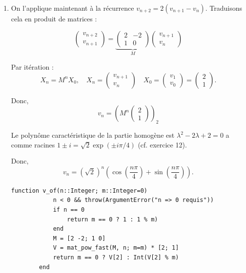 \begin{solution}
\begin{enumerate}
\begin{lstlisting}[basicstyle=\ttfamily\small, mathescape=true]
        function mat_pow_fast(A, n::Integer; m::Integer=0)
            n < 0 && throw(ArgumentError("n => 0 requis"))
            R = [1 0; 0 1]
            B, e = copy(A), n
            while e > 0
                if isodd(e)
                    R = mul2(R, B; m=m)
                end
                B = mul2(B, B; m=m)
                e >>= 1
            end
            return R
        end
        \end{lstlisting}

        \item On l'applique maintenant à la récurrence $v_{n+2} = 2(v_{n+1} - v_n)$. Traduisons cela en produit de matrices : 
        
        $$
        \begin{pmatrix} v_{n+2}\\ v_{n+1}\end{pmatrix}
        =
        \underbrace{\begin{pmatrix}2&-2\\[2pt]1&0\end{pmatrix}}_{M}
        \begin{pmatrix}v_{n+1}\\ v_n\end{pmatrix}
        $$

        Par itération :
        $$
        X_n = M^n X_0, \quad X_n = \begin{pmatrix} v_{n+1} \\ v_n \end{pmatrix} \quad X_0 = \begin{pmatrix} v_{1} \\ v_0 \end{pmatrix} = \begin{pmatrix} 2\\ 1 \end{pmatrix}.
        $$

        Donc, 
        $$
        v_n = (M^n \begin{pmatrix} 2 \\ 1 \end{pmatrix})_2
        $$

        Le polynôme caractéristique de la partie homogène est $\lambda^2 -2\lambda + 2 = 0$ a comme racines $1\pm i = \sqrt{2} \exp{(\pm i \pi / 4)}$ (cf. exercice 12).

        Donc, 
        \[
        v_n = (\sqrt{2})^n (\cos{(\frac{n \pi}{4})} + \sin{(\frac{n \pi}{4})}).
        \]
        

        \begin{lstlisting}[basicstyle=\ttfamily\small, mathescape=true]
        function v_of(n::Integer; m::Integer=0)
            n < 0 && throw(ArgumentError("n => 0 requis"))
            if n == 0
                return m == 0 ? 1 : 1 % m)
            end
            M = [2 -2; 1 0]
            V = mat_pow_fast(M, n; m=m) * [2; 1]
            return m == 0 ? V[2] : Int(V[2] % m)
        end
        \end{lstlisting}
        
    \end{enumerate}
\end{solution}
